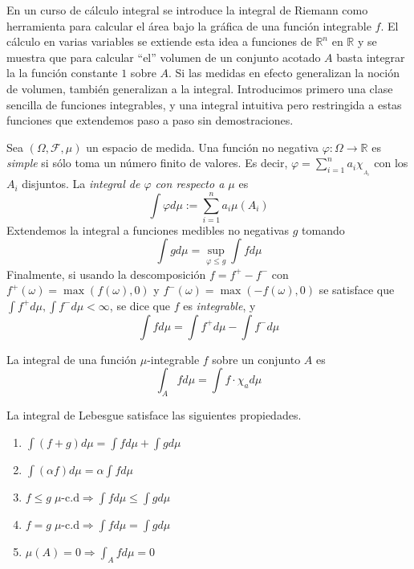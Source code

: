 \documentclass[main.tex]{subfiles}
\begin{document}
En un curso de cálculo integral se introduce la integral de Riemann como herramienta para calcular el área bajo la gráfica de una función integrable $f$. El cálculo en varias variables se extiende esta idea a funciones de $\mathbb{R}^n$ en $\mathbb{R}$ y se muestra que para calcular \enquote{el} volumen de un conjunto acotado $A$ basta integrar la la función constante $1$ sobre $A$. Si las medidas en efecto generalizan la noción de volumen, también generalizan a la integral. Introducimos primero una clase sencilla de funciones integrables, y una integral intuitiva pero restringida a estas funciones que extendemos paso a paso sin demostraciones.

\begin{definition}\label{def:int}
Sea $(\Omega, \mathcal{F}, \mu)$ un espacio de medida. Una función no negativa $\varphi:\Omega\to\mathbb{R}$ es \textit{simple} si sólo toma un número finito de valores. Es decir, $\varphi=\sum_{i=1}^na_i\chi_{_{A_i}}$ con los $A_i$ disjuntos. La \textit{integral de $\varphi$ con respecto a $\mu$} es
\begin{equation*}
	\int\varphi d\mu := \sum_{i=1}^n a_i\mu(A_i)
\end{equation*}
Extendemos la integral a funciones medibles no negativas $g$ tomando
\begin{equation*}
	\int g d\mu = \sup_{\varphi \leq g}\int fd\mu
\end{equation*}
 Finalmente, si usando la descomposición $f=f^+ -f^-$ con $f^+(\omega)=\max\left(f(\omega), 0\right)$ y $f^-(\omega)=\max\left(-f(\omega), 0\right)$ se satisface que $\int f^+d\mu, \int f^-d\mu < \infty$, se dice que $f$ es \textit{integrable}, y
 \begin{equation*}
 \int f d\mu = 	\int f^+d\mu - \int f^-d\mu
 \end{equation*}
\end{definition}

\begin{definition}
	La integral de una función $\mu$-integrable $f$ sobre un conjunto $A$ es
	\begin{equation*}
	\int_A fd\mu = \int f\cdot\chi_a d\mu	
	\end{equation*}
\end{definition}

\begin{theorem}\label{thm:props-int}
La integral de Lebesgue satisface las siguientes propiedades.
\begin{enumerate}[label=\roman*.]
	\item $\int (f+g)d\mu = \int f d\mu + \int g d\mu$
	\item $\int(\alpha f)d\mu = \alpha \int f d\mu$
	\item $f \leq g \; \mu\text{-c.d} \Rightarrow \int fd\mu \leq \int gd\mu$
	\item $f = g\; \mu\text{-c.d} \Rightarrow \int fd\mu = \int gd\mu$
	\item $\mu(A)=0\Rightarrow \int_Afd\mu=0$
\end{enumerate}	
\end{theorem}
\end{document}
